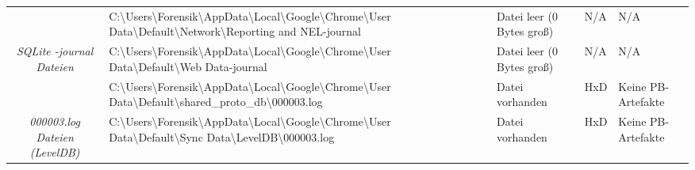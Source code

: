 \begin{appendices}
{\begin{landscape}
\begin{table}[h!]
{\begin{tabular}{cllll}
		\multicolumn{1}{|c|}{}                                                        & \multicolumn{1}{l|}{\cellcolor[HTML]{34CDF9}C:\textbackslash{}Users\textbackslash{}Forensik\textbackslash{}AppData\textbackslash{}Local\textbackslash{}Google\textbackslash{}Chrome\textbackslash{}User   Data\textbackslash{}Default\textbackslash{}Network\textbackslash{}Reporting and NEL-journal}                                                                          & \multicolumn{1}{l|}{\cellcolor[HTML]{AB70E9}Datei leer (0 Bytes groß)}                            & \multicolumn{1}{l|}{\cellcolor[HTML]{C0C0C0}N/A}           & \multicolumn{1}{l|}{\cellcolor[HTML]{C0C0C0}N/A}                \\ \cline{2-5} 
		\multicolumn{1}{|c|}{\multirow{-3}{*}{\textit{SQLite -journal Dateien}}}      & \multicolumn{1}{l|}{\cellcolor[HTML]{34CDF9}C:\textbackslash{}Users\textbackslash{}Forensik\textbackslash{}AppData\textbackslash{}Local\textbackslash{}Google\textbackslash{}Chrome\textbackslash{}User   Data\textbackslash{}Default\textbackslash{}Web Data-journal}                                                                                                          & \multicolumn{1}{l|}{\cellcolor[HTML]{AB70E9}Datei leer (0 Bytes groß)}                            & \multicolumn{1}{l|}{\cellcolor[HTML]{C0C0C0}N/A}           & \multicolumn{1}{l|}{\cellcolor[HTML]{C0C0C0}N/A}                \\ \hline
		\multicolumn{1}{|c|}{}                                                        & \multicolumn{1}{l|}{\cellcolor[HTML]{34CDF9}C:\textbackslash{}Users\textbackslash{}Forensik\textbackslash{}AppData\textbackslash{}Local\textbackslash{}Google\textbackslash{}Chrome\textbackslash{}User   Data\textbackslash{}Default\textbackslash{}shared\_proto\_db\textbackslash{}000003.log}                                                                               & \multicolumn{1}{l|}{\cellcolor[HTML]{009901}Datei vorhanden}                                      & \multicolumn{1}{l|}{HxD}                                   & \multicolumn{1}{l|}{\cellcolor[HTML]{F8A102}Keine PB-Artefakte} \\ \cline{2-5} 
		\multicolumn{1}{|c|}{\multirow{-2}{*}{\textit{000003.log Dateien (LevelDB)}}} & \multicolumn{1}{l|}{\cellcolor[HTML]{34CDF9}C:\textbackslash{}Users\textbackslash{}Forensik\textbackslash{}AppData\textbackslash{}Local\textbackslash{}Google\textbackslash{}Chrome\textbackslash{}User   Data\textbackslash{}Default\textbackslash{}Sync Data\textbackslash{}LevelDB\textbackslash{}000003.log}                                                                & \multicolumn{1}{l|}{\cellcolor[HTML]{009901}Datei vorhanden}                                      & \multicolumn{1}{l|}{HxD}                                   & \multicolumn{1}{l|}{\cellcolor[HTML]{F8A102}Keine PB-Artefakte} \\ \hline

\end{tabular}}
\end{table}
\end{landscape}}
\end{appendices}

